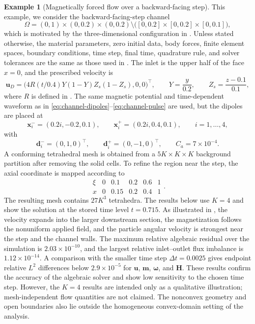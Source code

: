 \documentclass[11pt,a4paper]{article}
\newcommand{\bs}{\boldsymbol}
\theoremstyle{definition}
\newtheorem{example}{Example}
\numberwithin{equation}{section}
\begin{document}
\begin{example}[Magnetically forced flow over a backward-facing step]
This example, we consider the backward-facing-step channel
\begin{equation}\label{eq:step-domain}
 \Omega
 =
 (0,1)\times(0,0.2)\times(0,0.2)
 \setminus
 \bigl([0,0.2]\times[0,0.2]\times[0,0.1]\bigr),
\end{equation}
which is motivated by the three-dimensional configuration in
\cite{DongHuangHuangYang2026}. Unless stated otherwise, the material
parameters, zero initial data, body forces, finite element spaces,
boundary conditions, time step, final time, quadrature rule, and solver
tolerances are the same as those used in
. The inlet is the upper half of the face
\(x=0\), and the prescribed velocity is
\begin{equation}\label{eq:step-inlet}
 \bs u_D
 =
 \bigl(
 4R(t/0.4)Y(1-Y)Z_s(1-Z_s),0,0
 \bigr)^\intercal,
 \qquad
 Y=\frac{y}{0.2},
 \qquad
 Z_s=\frac{z-0.1}{0.1},
\end{equation}
where \(R\) is defined in . The same magnetic
potential and time-dependent waveform as in
\eqref{eq:channel-dipoles}--\eqref{eq:channel-pulse} are used, but the
dipoles are placed at
\[
 \bs x_i^-=(0.2i,-0.2,0.1),
 \qquad
 \bs x_i^+=(0.2i,0.4,0.1),
 \qquad i=1,\ldots,4,
\]
with
\[
 \bs d_i^-=(0,1,0)^\intercal,
 \qquad
 \bs d_i^+=(0,-1,0)^\intercal,
 \qquad
 C_a=7\times10^{-4}.
\]
A conforming tetrahedral mesh is obtained from a
\(5K\times K\times K\) background partition after removing the solid
cells. To refine the region near the step, the axial coordinate is
mapped according to
\[
\begin{array}{c|ccccc}
 \xi&0&0.1&0.2&0.6&1\\
 \hline
 x&0&0.15&0.2&0.4&1
\end{array}.
\]
The resulting mesh contains \(27K^3\) tetrahedra. The results below use
\(K=4\) and show the solution at the stored time level \(t=0.715\).
As illustrated in
, the velocity expands into
the larger downstream section, the magnetization follows the
nonuniform applied field, and the particle angular velocity is strongest
near the step and the channel walls. The maximum relative algebraic
residual over the simulation is \(2.03\times10^{-10}\), and the largest
relative inlet--outlet flux imbalance is \(1.12\times10^{-14}\). A
comparison with the smaller time step \(\Delta t=0.0025\) gives endpoint
relative \(L^2\) differences below \(2.9\times10^{-5}\) for
\(\bs u\), \(\bs m\), \(\bs\omega\), and \(\bs H\). These results
confirm the accuracy of the algebraic solver and show low sensitivity
to the chosen time step. However, the \(K=4\) results are intended only
as a qualitative illustration; mesh-independent flow quantities are
not claimed. The nonconvex geometry and open boundaries also lie outside
the homogeneous convex-domain setting of the analysis.


\end{example}
\end{document}
